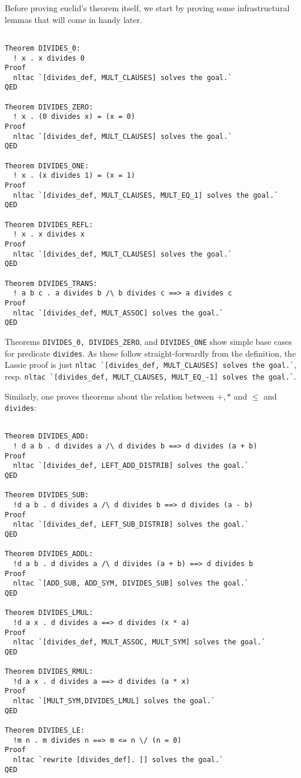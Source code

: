 Before proving euclid's theorem itself, we start by proving some infrastructural
lemmas that will come in handy later.
\begin{lstlisting}

Theorem DIVIDES_0:
  ! x . x divides 0
Proof
  nltac `[divides_def, MULT_CLAUSES] solves the goal.`
QED

Theorem DIVIDES_ZERO:
  ! x . (0 divides x) = (x = 0)
Proof
  nltac `[divides_def, MULT_CLAUSES] solves the goal.`
QED

Theorem DIVIDES_ONE:
  ! x . (x divides 1) = (x = 1)
Proof
  nltac `[divides_def, MULT_CLAUSES, MULT_EQ_1] solves the goal.`
QED

Theorem DIVIDES_REFL:
  ! x . x divides x
Proof
  nltac `[divides_def, MULT_CLAUSES] solves the goal.`
QED

Theorem DIVIDES_TRANS:
  ! a b c . a divides b /\ b divides c ==> a divides c
Proof
  nltac `[divides_def, MULT_ASSOC] solves the goal.`
QED
\end{lstlisting}

Theorems \lstinline{DIVIDES_0, DIVIDES_ZERO}, and \lstinline{DIVIDES_ONE} show
simple base cases for predicate \lstinline{divides}.
As these follow straight-forwardly from the definition, the Lassie proof is just
\lstinline{nltac `[divides_def, MULT_CLAUSES] solves the goal.`}, resp.
\lstinline{nltac `[divides_def, MULT_CLAUSES, MULT_EQ_-1] solves the goal.`}.

Similarly, one proves theorems about the relation between $+, *$ and $\leq$ and
\lstinline{divides}:
\begin{lstlisting}

Theorem DIVIDES_ADD:
  ! d a b . d divides a /\ d divides b ==> d divides (a + b)
Proof
  nltac `[divides_def, LEFT_ADD_DISTRIB] solves the goal.`
QED

Theorem DIVIDES_SUB:
  !d a b . d divides a /\ d divides b ==> d divides (a - b)
Proof
  nltac `[divides_def, LEFT_SUB_DISTRIB] solves the goal.`
QED

Theorem DIVIDES_ADDL:
  !d a b . d divides a /\ d divides (a + b) ==> d divides b
Proof
  nltac `[ADD_SUB, ADD_SYM, DIVIDES_SUB] solves the goal.`
QED

Theorem DIVIDES_LMUL:
  !d a x . d divides a ==> d divides (x * a)
Proof
  nltac `[divides_def, MULT_ASSOC, MULT_SYM] solves the goal.`
QED

Theorem DIVIDES_RMUL:
  !d a x . d divides a ==> d divides (a * x)
Proof
  nltac `[MULT_SYM,DIVIDES_LMUL] solves the goal.`
QED

Theorem DIVIDES_LE:
  !m n . m divides n ==> m <= n \/ (n = 0)
Proof
  nltac `rewrite [divides_def]. [] solves the goal.`
QED
\end{lstlisting}

